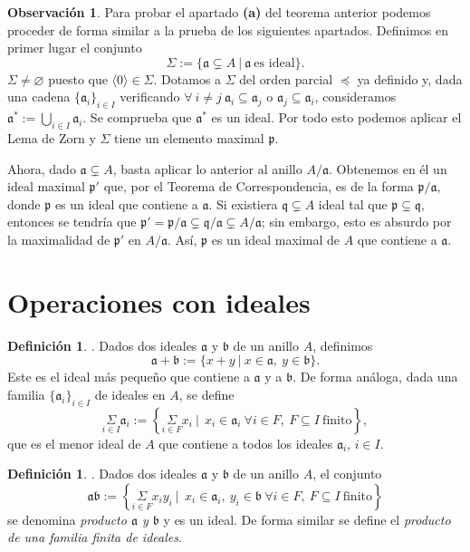 \documentclass[a4paper,12pt]{article}
\newcommand{\p}{\mathfrak{p}}
\newcommand{\q}{\mathfrak{q}}
\newcommand{\af}{\mathfrak{a}}
\newcommand{\bfr}{\mathfrak{b}}
\theoremstyle{definition}
\newtheorem{definition}[theorem]{Definición}
\newtheorem{remark}[theorem]{Observación}
\begin{document}
\begin{remark} Para probar el apartado \textbf{(a)} del teorema anterior podemos proceder de forma similar a la prueba de los siguientes apartados. Definimos en primer lugar el conjunto$$\Sigma:=\{\af\subsetneq A\ |\ \af\ \text{es ideal}\}.$$
$\Sigma\neq\varnothing$ puesto que $\langle 0\rangle\in\Sigma$. Dotamos a $\Sigma$ del orden parcial $\preceq$ ya definido y, dada una cadena $\{\af_i\}_{i\in I}$ verificando $\forall\ i\neq j\ \af_i\subseteq \af_j$ o $\af_j\subseteq\af_i$, consideramos $\af^*:=\bigcup_{i\in I}\af_i$. Se comprueba que $\af^*$ es un ideal. Por todo esto podemos aplicar el Lema de Zorn y $\Sigma$ tiene un elemento maximal $\p$.

Ahora, dado $\af\subsetneq A$, basta aplicar lo anterior al anillo $A/\af$. Obtenemos en él un ideal maximal $\p'$ que, por el Teorema de Correspondencia, es de la forma $\p/\af$, donde $\p$ es un ideal que contiene a $\af$.
Si existiera $\q\subsetneq A$ ideal tal que $\p\subsetneq\q$, entonces se tendría que $\p'=\p/\af\subsetneq\q/\af\subsetneq A/\af$; sin embargo, esto es absurdo por la maximalidad de $\p'$ en $A/\af$.
Así, $\p$ es un ideal maximal de $A$ que contiene a $\af$.
\end{remark}

\section{Operaciones con ideales}
\begin{definition}. Dados dos ideales $\af$ y $\bfr$ de un anillo $A$, definimos$$\af+\bfr:=\{x+y\ |\ x\in\af,\ y\in\bfr\}.$$Este es el ideal más pequeño que contiene a $\af$ y a $\bfr$.
De forma análoga, dada una familia $\{\af_i\}_{i\in I}$ de ideales en $A$, se define$$\underset{i\in I}{\Sigma}\af_i:=\left\{\underset{i\in F}{\Sigma} x_i\ |\ \ x_i\in\af_i\ \forall i\in F,\ F\subseteq I\ \text{finito}\right\},$$que es el menor ideal de $A$ que contiene a todos los ideales $\af_i$, $i\in I$.
\end{definition}

\begin{definition}. Dados dos ideales $\af$ y $\bfr$ de un anillo $A$, el conjunto$$\af\bfr:=\left\{\underset{i\in F}{\Sigma} x_iy_i\ |\ \ x_i\in\af_i,\ y_i\in\bfr\ \forall i\in F,\ F\subseteq I\ \text{finito}\right\}$$se denomina \textit{producto $\af$ y $\bfr$} y es un ideal. De forma similar se define el \textit{producto de una familia finita de ideales}.
\end{definition}
\end{document}
